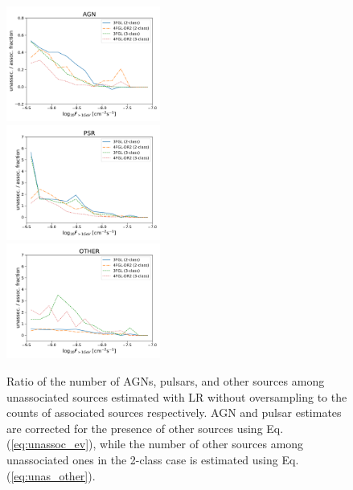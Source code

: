 \documentclass{aa}
\begin{document}
\begin{figure}[h]
\centering
\includegraphics[width=0.45\textwidth]{plots/N_logS_diff_AGN.pdf} \\
\includegraphics[width=0.45\textwidth]{plots/N_logS_diff_PSR.pdf} \\
\includegraphics[width=0.45\textwidth]{plots/N_logS_diff_OTHER.pdf}
\caption{Ratio of the number of AGNs, pulsars, and other sources among unassociated sources estimated with LR without oversampling
to the counts of associated sources respectively.
AGN and pulsar estimates are corrected for the presence of other sources using Eq. (\ref{eq:unassoc_ev}),
while the number of other sources among unassociated ones in the 2-class case is estimated using Eq. (\ref{eq:unas_other}).
} 
\label{fig:unass_vs_ass_frac}
\end{figure}
\end{document}
